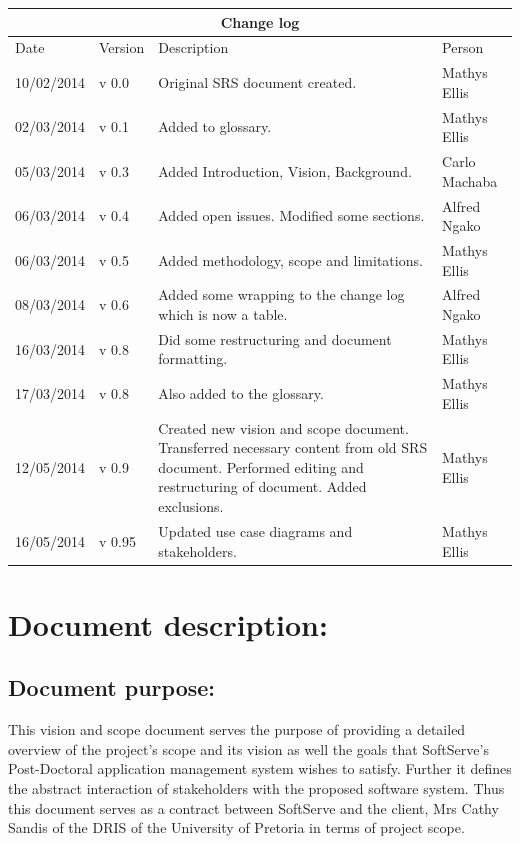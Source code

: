 \documentclass[12pt]{article}
\begin{document}
\begin{center}
\begin{tabular}{|l|p{1.4cm}|p{8cm}|p{2.8cm}|}
\hline
\multicolumn{4}{|c|}{\bf Change log} \\
\hline
 Date & Version & Description &  Person \\
\hline
10/02/2014 & v 0.0 & Original SRS document created. & Mathys Ellis \\
\hline
02/03/2014 & v 0.1 & Added to glossary. & Mathys Ellis \\
\hline
05/03/2014 & v 0.3 & Added Introduction, Vision, Background. & Carlo Machaba \\
\hline
06/03/2014 & v 0.4 & Added open issues. Modified some sections. & Alfred Ngako \\
\hline
06/03/2014 & v 0.5 & Added methodology, scope and limitations. & Mathys Ellis \\
\hline
08/03/2014 & v 0.6 & Added some wrapping to the change log which is now a table. & Alfred Ngako \\
\hline
16/03/2014 & v 0.8 & Did some restructuring and document formatting. & Mathys Ellis \\
\hline
17/03/2014 & v 0.8 & Also added to the glossary. & Mathys Ellis \\
\hline
12/05/2014 & v 0.9 & Created new vision and scope document. Transferred necessary content from old SRS document. Performed editing and restructuring of document. Added exclusions. & Mathys Ellis \\
\hline
16/05/2014 & v 0.95 & Updated use case diagrams and stakeholders. & Mathys Ellis \\
\hline
\end{tabular}
\end{center}
\newpage
\tableofcontents

\listoffigures
\newpage
\section{Document description:}

\subsection{Document purpose:}
\vspace{0.2in}
This vision and scope document serves the purpose of providing a detailed overview of the project's scope and its vision as well the goals that SoftServe's Post-Doctoral application management system wishes to satisfy. Further it defines the abstract interaction of stakeholders with the proposed software system. Thus this document serves as a contract between SoftServe and the client, Mrs Cathy Sandis of the DRIS of the University of Pretoria in terms of project scope.
\end{document}
